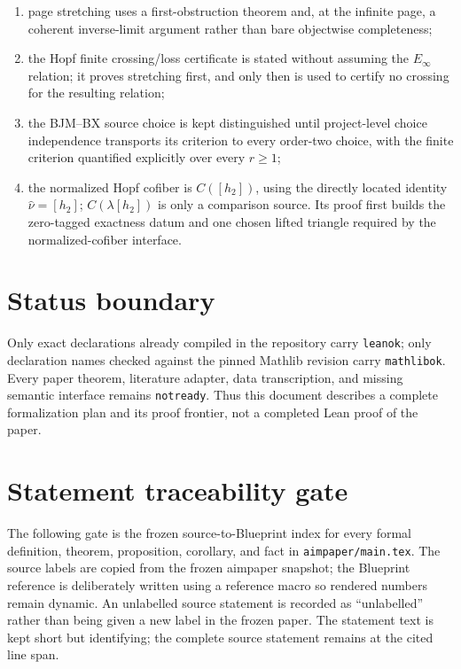 \begin{enumerate}
    May's diagram, not from a false converse for a preselected representative;
  \item page stretching uses a first-obstruction theorem and, at the infinite
    page, a coherent inverse-limit argument rather than bare objectwise
    completeness;
  \item the Hopf finite crossing/loss certificate is stated without assuming
    the $E_\infty$ relation; it proves stretching first, and only then is used
    to certify no crossing for the resulting relation;
  \item the BJM--BX source choice is kept distinguished until project-level
    choice independence transports its criterion to every order-two choice,
    with the finite criterion quantified explicitly over every $r\ge1$;
  \item the normalized Hopf cofiber is $C([h_2])$, using the directly located
    identity $\widehat\nu=[h_2]$; $C(\lambda[h_2])$ is only a comparison
    source.  Its proof first builds the zero-tagged exactness datum and one
    chosen lifted triangle required by the normalized-cofiber interface.
\end{enumerate}

\section{Status boundary}

Only exact declarations already compiled in the repository carry
\texttt{leanok}; only declaration names checked against the pinned Mathlib
revision carry \texttt{mathlibok}.  Every paper theorem, literature adapter,
data transcription, and missing semantic interface remains
\texttt{notready}.  Thus this document describes a complete formalization
plan and its proof frontier, not a completed Lean proof of the paper.

\section{Statement traceability gate}

The following gate is the frozen source-to-Blueprint index for every formal
definition, theorem, proposition, corollary, and fact in
\texttt{aimpaper/main.tex}. The source labels are copied from the frozen
aimpaper snapshot; the Blueprint reference is deliberately
written using a reference macro so rendered numbers remain dynamic. An unlabelled
source statement is recorded as ``unlabelled'' rather than being given a new
label in the frozen paper. The statement text is kept short but identifying;
the complete source statement remains at the cited line span.

